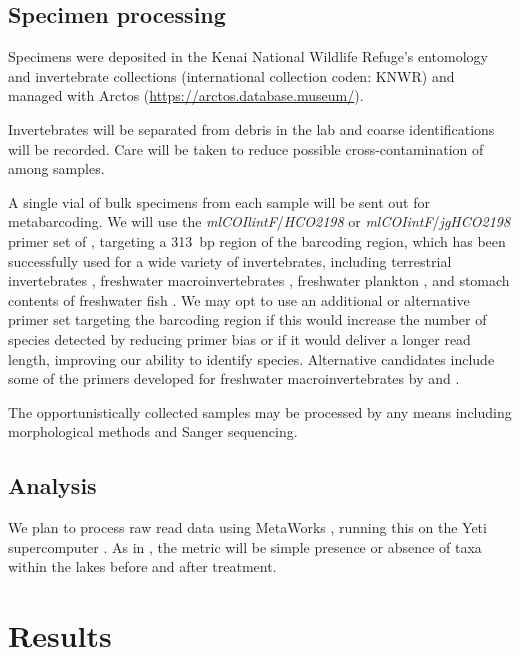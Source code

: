 \begin{multicols}{2}


\subsection{Specimen processing}

Specimens were deposited in the Kenai National Wildlife Refuge's entomology and invertebrate collections (international collection coden: KNWR) and managed with Arctos (\url{https://arctos.database.museum/}).

Invertebrates will be separated from debris in the lab and coarse identifications will be recorded. Care will be taken to reduce possible cross-contamination of  among samples.

A single vial of bulk specimens from each sample will be sent out for metabarcoding. We will use the \textit{mlCOIlintF}/\textit{HCO2198} or \textit{mlCOIintF}/\textit{jgHCO2198} primer set of \citet{Lerayetal2013}, targeting a 313~bp region of the   barcoding region, which has been successfully used for a wide variety of invertebrates, including terrestrial invertebrates \citep{Bowseretal2020}, freshwater macroinvertebrates \citep{Hajibabaeietal2019}, freshwater plankton \citep{Yangetal2017}, and stomach contents of freshwater fish \citep{BowserBowser2020}. We may opt to use an additional or alternative primer set targeting the   barcoding region if this would increase the number of species detected by reducing primer bias or if it would deliver a longer read length, improving our ability to identify species. Alternative candidates include some of the primers developed for freshwater macroinvertebrates by \citet{ElbrechtLeese2017} and \citet{Vamosetal2017}.

The opportunistically collected samples may be processed by any means including morphological methods and Sanger sequencing.

\subsection{Analysis}

We plan to process raw read data using MetaWorks \citep{PorterHajibabaei2020}, running this on the Yeti supercomputer \citep{USGSARC2021}. As in \citet{Massengill2014, Massengill2017}, the metric will be simple presence or absence of taxa within the lakes before and after treatment.


\section{Results}


\end{multicols}
